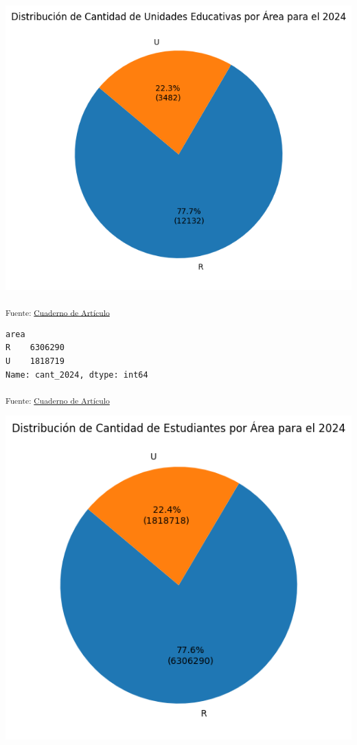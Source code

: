 \documentclass[
  12pt]{article}
\begin{document}
\includegraphics{index_files/figure-pdf/cell-25-output-1.png}

\textsubscript{Fuente: \href{sociest.org/index.ipynb.html}{Cuaderno de
Artículo}}

\begin{verbatim}
area
R    6306290
U    1818719
Name: cant_2024, dtype: int64
\end{verbatim}

\textsubscript{Fuente: \href{sociest.org/index.ipynb.html}{Cuaderno de
Artículo}}

\includegraphics{index_files/figure-pdf/cell-27-output-1.png}
\end{document}
